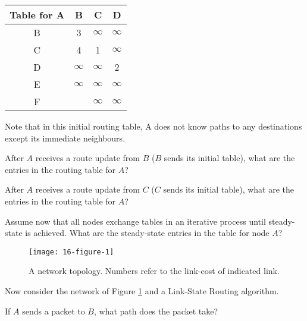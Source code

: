 \documentclass{supervision}
\begin{document}
\begin{questions}
\begin{parts}
          \begin{table}[h]
            \centering
            \begin{tabular}{|c|ccc|}
              \hline
              Table for A & B        & C        & D        \\ \hline
              B           & 3        & $\infty$ & $\infty$ \\
              C           & 4        & 1        & $\infty$ \\
              D           & $\infty$ & $\infty$ & 2        \\
              E           & $\infty$ & $\infty$ & $\infty$ \\
              F           &          & $\infty$ & $\infty$ \\ \hline
            \end{tabular}
          \end{table}

          Note that in this initial routing table, A does not know paths
          to any destinations except its immediate neighbours.

          \begin{subparts}
            \subpart After $A$ receives a route update from $B$ ($B$ sends
              its initial table), what are the entries in the routing table
              for $A$?

            \subpart After $A$ receives a route update from $C$ ($C$ sends
              its initial table), what are the entries in the routing table
              for $A$?

            \subpart Assume now that all nodes exchange tables in an
              iterative process until steady-state is achieved. What are the
              steady-state entries in the table for node $A$?
          \end{subparts}

          \begin{figure}[h]
            \caption{A network topology. Numbers refer to the link-cost of
              indicated link.}
            \label{fig:1}
            \centering
              \texttt{[image: 16-figure-1]}
          \end{figure}

          Now consider the network of Figure \ref{fig:1} and a Link-State
          Routing algorithm.

          \begin{subparts}
            \subpart If $A$ sends a packet to $B$, what path does the packet
              take?


\end{subparts}
\end{parts}
\end{questions}
\end{document}
